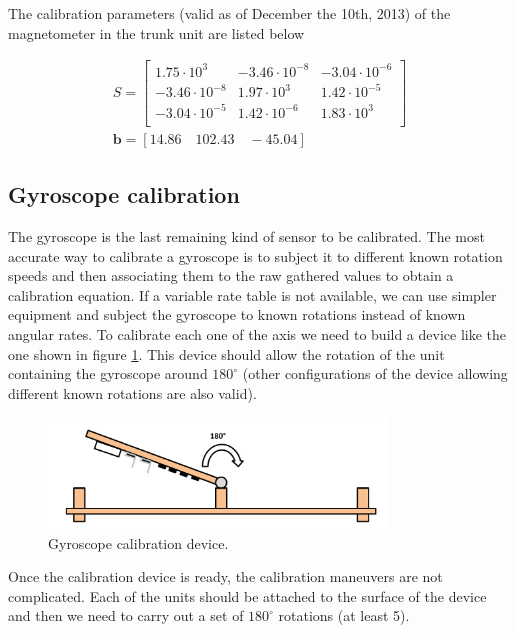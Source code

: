 The calibration parameters (valid as of December the 10th, 2013) of the magnetometer in the trunk unit are listed below 

\begin{gather}
\label{eq:mag_cal_params}
S = \left[\begin{array}{ccc}
		1.75\cdot10^{3} 	& -3.46\cdot10^{-8} & -3.04\cdot10^{-6} \\
		-3.46\cdot10^{-8}	&	1.97\cdot10^{3}	 & 1.42\cdot10^{-5} \\
		-3.04\cdot10^{-5}	& 1.42\cdot10^{-6} & 1.83\cdot10^{3}  \\
		\end{array}\right] \\ \nonumber
\mathbf{b} = \left[14.86\quad 102.43\quad -45.04\right]
\end{gather}

\subsection{Gyroscope calibration}
\label{subsec:gyro_calibration}

\indent \indent The gyroscope is the last remaining kind of sensor to be calibrated. The most accurate way to calibrate a gyroscope is to subject it to different known rotation speeds and then associating them to the raw gathered values to obtain a calibration equation. If a variable rate table is not available, we can use simpler equipment and subject the gyroscope to known rotations instead of known angular rates. To calibrate each one of the axis we need to build a device like the one shown in figure \ref{fig:gyro_turn_device}. This device should allow the rotation of the unit containing the gyroscope around $180^{\circ}$ (other configurations of the device allowing different known rotations are also valid). 

\begin{figure}[H]
\centering
\includegraphics[width=0.8\textwidth]{figures/gyro_turn_device}
\caption{Gyroscope calibration device.}
\label{fig:gyro_turn_device}
\end{figure}

Once the calibration device is ready, the calibration maneuvers are not complicated. Each of the units should be attached to the surface of the device and then we need to carry out a set of $180^{\circ}$ rotations (at least 5). \\

